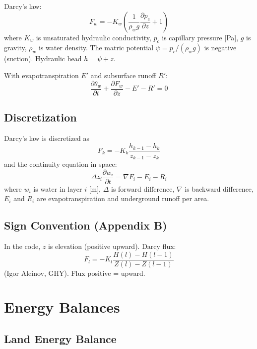 \documentclass[11pt,a4paper]{article}
\begin{document}
Darcy's law:
\begin{equation}
F_w = -K_w \left( \frac{1}{\rho_w g}\frac{\partial p_c}{\partial z} + 1 \right)
\end{equation}
where $K_w$ is unsaturated hydraulic conductivity, $p_c$ is capillary pressure [Pa], $g$ is gravity, $\rho_w$ is water density. The matric potential $\psi = p_c/(\rho_w g)$ is negative (suction). Hydraulic head $h = \psi + z$.

With evapotranspiration $E'$ and subsurface runoff $R'$:
\begin{equation}
\frac{\partial \theta_w}{\partial t} + \frac{\partial F_w}{\partial z} - E' - R' = 0
\end{equation}

\subsection{Discretization}

Darcy's law is discretized as
\begin{equation}
F_k = -K_k \frac{h_{k-1} - h_k}{z_{k-1} - z_k}
\end{equation}
and the continuity equation in space:
\begin{equation}
\Delta z_i \frac{\partial w_i}{\partial t} = \nabla F_i - E_i - R_i
\end{equation}
where $w_i$ is water in layer $i$ [m], $\Delta$ is forward difference, $\nabla$ is backward difference, $E_i$ and $R_i$ are evapotranspiration and underground runoff per area.

\subsection{Sign Convention (Appendix B)}

In the code, $z$ is elevation (positive upward). Darcy flux:
\begin{equation}
F_l = -K_l \frac{H(l) - H(l-1)}{Z(l) - Z(l-1)}
\end{equation}
(Igor Aleinov, GHY). Flux positive = upward.

\section{Energy Balances}

\subsection{Land Energy Balance}
\end{document}
